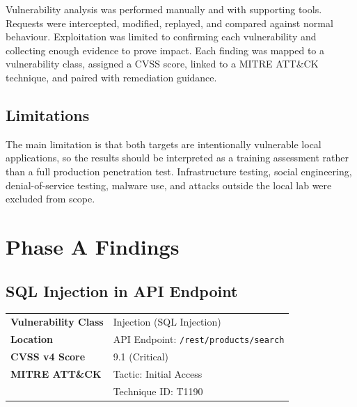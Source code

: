 \documentclass[11pt,a4paper]{report}
\begin{document}
        Vulnerability analysis was performed manually and with supporting tools. Requests were intercepted, modified, replayed, and compared against normal behaviour. Exploitation was limited to confirming each vulnerability and collecting enough evidence to prove impact. Each finding was mapped to a vulnerability class, assigned a CVSS score, linked to a MITRE ATT\&CK technique, and paired with remediation guidance.

        \section{Limitations}

        The main limitation is that both targets are intentionally vulnerable local applications, so the results should be interpreted as a training assessment rather than a full production penetration test. Infrastructure testing, social engineering, denial-of-service testing, malware use, and attacks outside the local lab were excluded from scope.

    \chapter{Phase A Findings}
        
        \section{SQL Injection in API Endpoint}
        \label{sec:sqli-products-search}

        \vspace{0.4cm}

        \begin{tcolorbox}[colback=lightgray,colframe=headerblack,title=\textbf{Vulnerability Overview}]
        \begin{tabular}{>{\bfseries}p{5cm} p{10cm}}
        Vulnerability Class & Injection (SQL Injection) \\

        Location & API Endpoint: \texttt{/rest/products/search} \\

        CVSS v4 Score & 9.1 (Critical) \\

        MITRE ATT\&CK & Tactic: Initial Access \\
                    & Technique ID: T1190 \\
        \end{tabular}
        \end{tcolorbox}
\end{document}
